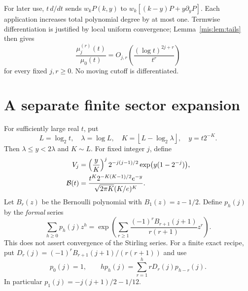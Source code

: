 \documentclass[11pt]{article}
\theoremstyle{remark}\newtheorem{remark}[theorem]{Remark}
\newcommand{\floor}[1]{\left\lfloor #1\right\rfloor}
\begin{document}
For later use, $t\,d/dt$ sends $w_kP(k,y)$ to
$w_k[(k-y)P+y\partial_yP]$. Each application increases total polynomial degree by at most one. Termwise differentiation is justified by local uniform convergence; Lemma~\ref{mis:lem:tails} then gives
\begin{equation}\label{mis:eq:derivatives}
 \frac{\mu_j^{(r)}(t)}{\mu_0(t)}
       =O_{j,r}\left(\frac{(\log t)^{2j+r}}{t^r}\right)
\end{equation}
for every fixed $j,r\ge0$. No moving cutoff is differentiated.

\section{A separate finite sector expansion}
For sufficiently large real $t$, put
\[
 L=\log_2t,\quad\lambda=\log L,\quad
 K=\floor{L-\log_2\lambda},\quad y=t2^{-K}.
\]
Then $\lambda\le y<2\lambda$ and $K\sim L$. For fixed integer $j$, define
\begin{align}
 V_j&=\left(\frac yK\right)^j2^{-j(j-1)/2}
                \exp\bigl(y(1-2^{-j})\bigr),\notag\\
 \mathcal B(t)&=\frac{t^K2^{-K(K-1)/2}e^{-y}}
                    {\sqrt{2\pi K}(K/e)^K}.\label{mis:eq:sectors}
\end{align}
Let $B_r(z)$ be the Bernoulli polynomial with $B_1(z)=z-1/2$. Define $p_h(j)$ by the \emph{formal} series
\begin{equation}\label{mis:eq:stirling-poly}
 \sum_{h\ge0}p_h(j)z^h
 =\exp\left(\sum_{r\ge1}
       \frac{(-1)^r B_{r+1}(j+1)}{r(r+1)}z^r\right).
\end{equation}
This does not assert convergence of the Stirling series. For a finite exact recipe, put $D_r(j)=(-1)^rB_{r+1}(j+1)/(r(r+1))$ and use
\[
 p_0(j)=1,\qquad h p_h(j)=\sum_{r=1}^h rD_r(j)p_{h-r}(j).
\]
In particular $p_1(j)=-j(j+1)/2-1/12$.
\end{document}

